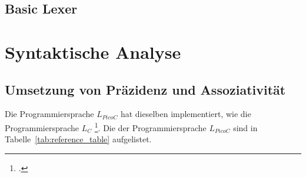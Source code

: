 \begin{grammar}
  \toprule
  \bottomrule
\end{grammar}



\subsection{Basic Lexer}
\section{Syntaktische Analyse}
\label{sec:syntaktische_analyse}

\subsection{Umsetzung von Präzidenz und Assoziativität}
\label{sec:umsetzung_von_präzidenz}

Die Programmiersprache $L_{PicoC}$ hat dieselben  implementiert, wie die Programmiersprache $L_C$ \footcite{noauthor_c_nodate}. Die  der Programmiersprache $L_{PicoC}$ sind in Tabelle~\ref{tab:reference_table} aufgelistet.

